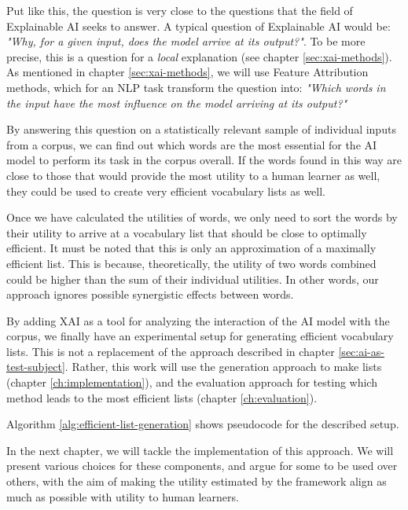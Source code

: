 Put like this, the question is very close to the questions that the field of Explainable AI seeks to answer.
A typical question of Explainable AI would be:
\textit{"Why, for a given input, does the model arrive at its output?"}. 
To be more precise, this is a question for a \textit{local} explanation (see chapter \ref{sec:xai-methods}).
As mentioned in chapter \ref{sec:xai-methods}, we will use Feature Attribution methods, which for an NLP task transform the question into:
\textit{"Which words in the input have the most influence on the model arriving at its output?"}

By answering this question on a statistically relevant sample of individual inputs from a corpus, we can find out which words are the most essential for the AI model to perform its task in the corpus overall.
If the words found in this way are close to those that would provide the most utility to a human learner as well, they could be used to create very efficient vocabulary lists as well.

Once we have calculated the utilities of words, we only need to sort the words by their utility to arrive at a vocabulary list that should be close to optimally efficient.
It must be noted that this is only an approximation of a maximally efficient list.
This is because, theoretically, the utility of two words combined could be higher than the sum of their individual utilities.
In other words, our approach ignores possible synergistic effects between words.

By adding XAI as a tool for analyzing the interaction of the AI model with the corpus, we finally have an experimental setup for generating efficient vocabulary lists.
This is not a replacement of the approach described in chapter \ref{sec:ai-as-test-subject}.
Rather, this work will use the generation approach to make lists (chapter \ref{ch:implementation}), and the evaluation approach for testing which method leads to the most efficient lists (chapter \ref{ch:evaluation}).

Algorithm \ref{alg:efficient-list-generation} shows pseudocode for the described setup.



In the next chapter, we will tackle the implementation of this approach.
We will present various choices for these components, and argue for some to be used over others, with the aim of making the utility estimated by the framework align as much as possible with utility to human learners.

